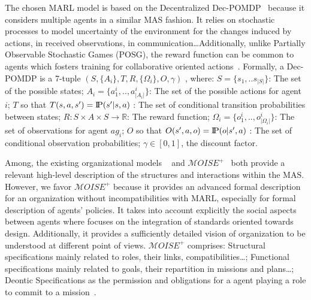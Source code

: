 \documentclass[runningheads]{llncs}
\newcommand{\probP}{\text{I\kern-0.15em P}}
\begin{document}
The chosen MARL model is based on the Decentralized Dec-POMDP~\cite{Oliehoek2016} because it considers multiple agents in a similar MAS fashion. It relies on stochastic processes to model uncertainty of the environment for the changes induced by actions, in received observations, in communication\dots Additionally, unlike Partially Observable Stochastic Games (POSG), the reward function can be common to agents which fosters training for collaborative oriented actions~\cite{Beynier2013}. Formally, a Dec-POMDP is a 7-tuple $(S,\{A_i\},T,R,\{\Omega_i\},O,\gamma)$ , where: $S = \{s_1, ..s_{|S|}\}$: The set of the possible states; $A_{i} = \{a_{1}^{i},..,a_{|A_{i}|}^{i}\}$: The set of the possible actions for agent $i$; $T$ so that $T(s,a,s') = \probP{(s'|s,a)}$ : The set of conditional transition probabilities between states; $R: S \times A \times S \rightarrow \mathbb{R}$: The reward function; $\Omega_{i} = \{o_{1}^{i},..,o_{|\Omega_{i}|}^{i}\}$: The set of observations for agent $ag_i$; $O$ so that $O(s',a,o) = \probP{(o|s',a)}$ : The set of conditional observation probabilities; $\gamma \in [0,1]$, the discount factor.

Among, the existing organizational models ~\cite{Ferber2004} and \allowbreak $\mathcal{M}OISE^+$~\cite{Hubner2002} both provide a relevant high-level description of the structures and interactions within the MAS. However, we favor $\mathcal{M}OISE^+$ because it provides an advanced formal description for an organization without incompatibilities with MARL, especially for formal description of agents' policies. It takes into account explicitly the social aspects between agents where  focuses on the integration of standards oriented towards design. Additionally, it provides a sufficiently detailed vision of organization to be understood at different point of views. $\mathcal{M}OISE^+$ comprises: Structural specifications mainly related to roles, their links, compatibilities\dots; Functional specifications mainly related to goals, their repartition in missions and plans\dots; Deontic Specifications as the permission and obligations for a agent playing a role to commit to a mission~\cite{Hubner2002}.



\end{document}
